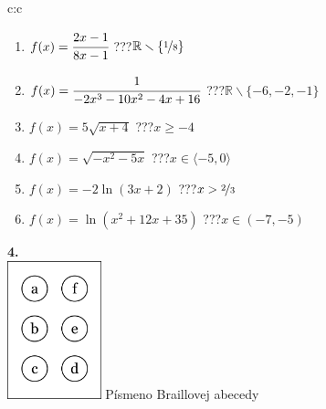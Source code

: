 \documentclass[10pt]{report}
\begin{document}
\begin{tabular}{c:c}
\begin{minipage}[c][104.5mm][t]{0.5\linewidth}
\begin{center}
\begin{minipage}{0.79\linewidth}
\begin{center}
\begin{varwidth}{\linewidth}
\begin{enumerate}
\item $f(x)=\cfrac{2x-1}{8x-1}$\quad \dotfill\; ???\;\dotfill \quad $\mathbb{R}\smallsetminus\{\nicefrac{1}{8}\}$
\item $f(x)=\cfrac{1}{-2x^3-10x^2-4x+16}$\quad \dotfill\; ???\;\dotfill \quad $\mathbb{R}\smallsetminus\{-6,-2,-1\}$
\item $f(x)=5\sqrt{x+4}$\quad \dotfill\; ???\;\dotfill \quad $x\geq-4$
\item $f(x)=\sqrt{-x^2-5x}$\quad \dotfill\; ???\;\dotfill \quad $x\in\langle-5 , 0\rangle$
\item $f(x)=-2\ln{(3x+2)}$\quad \dotfill\; ???\;\dotfill \quad $x>\nicefrac{2}{3}$
\item $f(x)=\ln{(x^2+12x+35)}$\quad \dotfill\; ???\;\dotfill \quad $x\in(-7 , -5)$
\end{enumerate}
\end{varwidth}
\end{center}
\end{minipage}
\begin{minipage}{0.20\linewidth}
\begin{center}
{\Huge\bfseries 4.} \\[2mm]
\includegraphics[height=40mm]{../images/braille.png}
{\small Písmeno Braillovej abecedy}
\end{center}
\end{minipage}
\end{center}
\end{minipage}
%
\end{tabular}
\newpage
\thispagestyle{empty}
\end{document}
